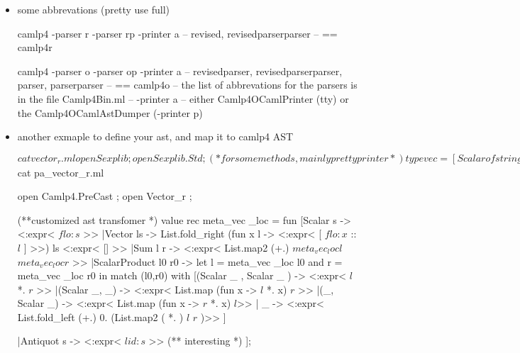 \begin{itemize}
\begin{bluecode}
open Camlp4.PreCast ;;
module Gram = MakeGram(Lexer );;
\end{bluecode}


\item some abbrevations (pretty use full)


\begin{bluecode}
camlp4 -parser r -parser rp -printer a
--  revised, revisedparserparser
-- == camlp4r

camlp4 -parser o -parser op -printer a
-- revisedparser, revisedparserparser, parser, parserparser
-- == camlp4o
-- the list of abbrevations for the parsers is in the file Camlp4Bin.ml
-- -printer a
-- either Camlp4OCamlPrinter (tty) or the Camlp4OCamlAstDumper (-printer p)

\end{bluecode}


\item another exmaple to define your ast, and map it to camlp4 AST   


\begin{bluecode}
$cat vector_r.ml
open Sexplib ; 
open Sexplib.Std ;  (* for some methods, mainly pretty printer  *)
type vec = 
  [Scalar of string 
  |Vector of  list string 
  |Sum of vec and vec 
  |ScalarProduct of vec and vec 
  |Antiquot of string ] 
with sexp ;

value (|>) x f = f x ;

value vec_to_string  vec = 
    vec |> sexp_of_vec |> Sexp.to_string ;


$cat pa_vector_r.ml

open Camlp4.PreCast ; 
open Vector_r ;

(**customized ast transfomer *)
value rec meta_vec _loc = fun 
  [Scalar s -> <:expr< $flo:s$ >>
  |Vector ls -> List.fold_right 
    (fun x l -> <:expr< [ $flo:x$ :: $l$ ] >>)
    ls <:expr< [] >> 
  |Sum l r -> <:expr< List.map2 (+.)  $meta_vec _loc l$   $meta_vec _loc r$ >> 
  |ScalarProduct l0 r0 -> 
    let l = meta_vec _loc l0 
    and r = meta_vec _loc r0 
    in match (l0,r0) with 
    [(Scalar _ , Scalar _ ) ->  <:expr< $l$ *. $r$ >>
    |(Scalar _,  _) -> 
      <:expr< List.map (fun x -> $l$ *. x) $r$ >>
    |(_, Scalar _) -> 
      <:expr< List.map (fun x -> $r$ *. x) $l$>>
    | _ -> 
      <:expr< List.fold_left (+.) 0. (List.map2 ( *. ) $l$ $r$ )>>
    ]

   |Antiquot s -> 
     <:expr< $lid:s$ >> (** interesting *)
  ]; 
\end{bluecode}




\end{itemize}
